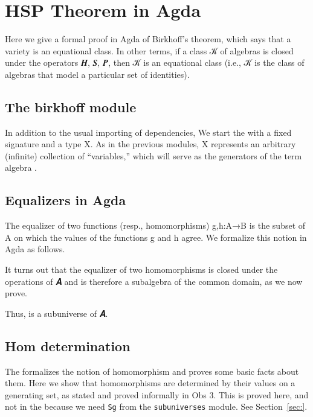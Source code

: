 \documentclass[a4paper,USenglish,cleveref,autoref,thm-restate]{lipics-v2019}
\begin{document}
\section{HSP Theorem in Agda}\label{sec:hsp-theorem-in-agda}
Here we give a formal proof in Agda of Birkhoff's theorem, which says that a variety is an equational class. In other terms, if a class 𝒦 of algebras is closed under the operators 𝑯, 𝑺, 𝑷, then 𝒦 is an equational class (i.e., 𝒦 is the class of algebras that model a particular set of identities).

\subsection{The birkhoff module}\label{sec:the-birkhoff-module}
In addition to the usual importing of dependencies, We start the \birkhoffmodule with a fixed signature and a type \AB X. As in the previous modules, \AB X represents an arbitrary (infinite) collection of ``variables,'' which will serve as the generators of the term algebra \TX.

\subsection{Equalizers in Agda}\label{sec:equalizers-in-agda}
The equalizer of two functions (resp., homomorphisms) \AB g\AS,\AS\AB h\AS\ASy :\AS\AB A\AS\ASy →\AS\AB B is the subset of \AB A on which the values of the functions \AB g and \AB h agree. We formalize this notion in Agda as follows.
\begin{code}\end{code}
It turns out that the equalizer of two homomorphisms is closed under the operations of \AB 𝑨 and is therefore a subalgebra of the common domain, as we now prove.
\begin{code}\end{code}
Thus,  is a subuniverse of \AB 𝑨.

\subsection{Hom determination}\label{sec:hom-determination}
The \homsmodule formalizes the notion of homomorphism and proves some basic facts about them. Here we show that homomorphisms are determined by their values on a generating set, as stated and proved informally in Obs 3. This is proved here, and not in the \homsmodule because we need \texttt{Sg} from the \texttt{subuniverses} module. See Section~\ref{sec:}.
\begin{code}\end{code}
\end{document}
